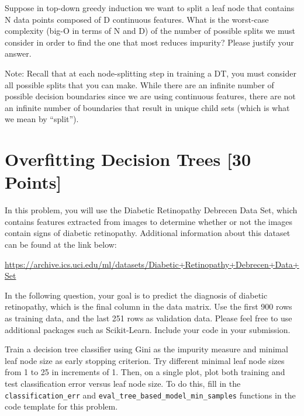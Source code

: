 \documentclass{article}
\begin{document}
\begin{solution}

\end{solution}

\problem[4] Suppose in top-down greedy induction we want to split a leaf node that contains N data points composed of
D continuous features. What is the worst-case
complexity (big-O in terms of N and D) of the number of possible splits we must consider in order to find the one that most reduces impurity? Please justify your answer.

Note: Recall that at each node-splitting step in training a DT, you must consider all possible splits that you can make. While there are an infinite number of possible decision boundaries since we are using continuous features, there are not an infinite number of boundaries that result in unique child sets (which is what we mean by ``split'').



\begin{solution}

\end{solution}




\newpage


\section{Overfitting Decision Trees [30 Points]}

In this problem, you will use the Diabetic Retinopathy Debrecen Data Set, which contains features extracted from images to determine whether or not the images contain signs of diabetic retinopathy. Additional information about this dataset can be found at the link below:

\url{https://archive.ics.uci.edu/ml/datasets/Diabetic+Retinopathy+Debrecen+Data+Set}

In the following question, your goal is to predict the diagnosis of diabetic retinopathy, which is the final column in the data matrix.  Use the first 900 rows as training data, and the last
251 rows as validation data. Please feel free to use additional packages such as Scikit-Learn. Include your code in your submission.

\indent\problem[7] %
Train a decision tree classifier using Gini as the impurity measure and minimal leaf node size as early stopping criterion. Try different minimal leaf node sizes from 1 to 25 in increments of 1. Then, on a single plot, plot both training and test classification error versus leaf node size. To do this, fill in the \texttt{classification_err} and \texttt{eval_tree_based_model_min_samples} functions in the code template for this problem.
\end{document}
